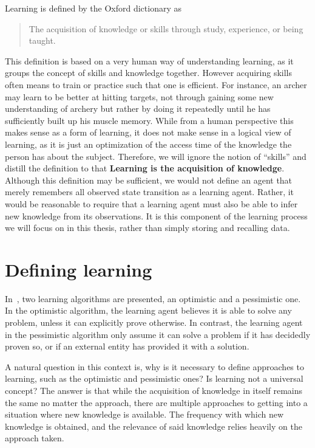 \documentclass[\master/Master.tex]{subfiles}
\begin{document}
	
	Learning is defined by the Oxford dictionary as 
	\begin{quote}
		The acquisition of knowledge or skills through study, experience, or being taught.
	\end{quote}
	
	This definition is based on a very human way of understanding learning, as it groups the concept of skills and knowledge together.
	However acquiring skills often means to train or practice such that one is efficient. For instance, an archer may learn to be better at hitting targets, 
	not through gaining some new understanding of archery but rather by doing it repeatedly until he has sufficiently built up his muscle memory.
	While from a human perspective this makes sense as a form of learning, 
	it does not make sense in a logical view of learning, as it is just an optimization of the access time of the knowledge the person has about the subject.
    Therefore, we will ignore the notion of ``skills'' and distill the definition to that \textbf{Learning is the acquisition of knowledge}. Although this definition may be sufficient, we would not define an agent that merely remembers all observed state transition as a learning agent. Rather, it would be reasonable to require that a learning agent must also be able to infer new knowledge from its observations. It is this component of the learning process we will focus on in this thesis, rather than simply storing and recalling data.

\section{Defining learning}
	
	In~\cite{Walsh2008}, two learning algorithms are presented, an optimistic and a pessimistic one.
    In the optimistic algorithm, the learning agent believes it is able to solve any problem, unless it can explicitly prove otherwise. In contrast, the learning agent in the pessimistic algorithm only assume it can solve a problem if it has decidedly proven so, or if an external entity has provided it with a solution. 

A natural question in this context is, why is it necessary to define approaches to learning, such as the optimistic and pessimistic ones? Is learning not a universal concept? The answer is that while the acquisition of knowledge in itself remains the same no matter the approach, there are multiple approaches to getting into a situation where new knowledge is available. The frequency with which new knowledge is obtained, and the relevance of said knowledge relies heavily on the approach taken.
\end{document}
